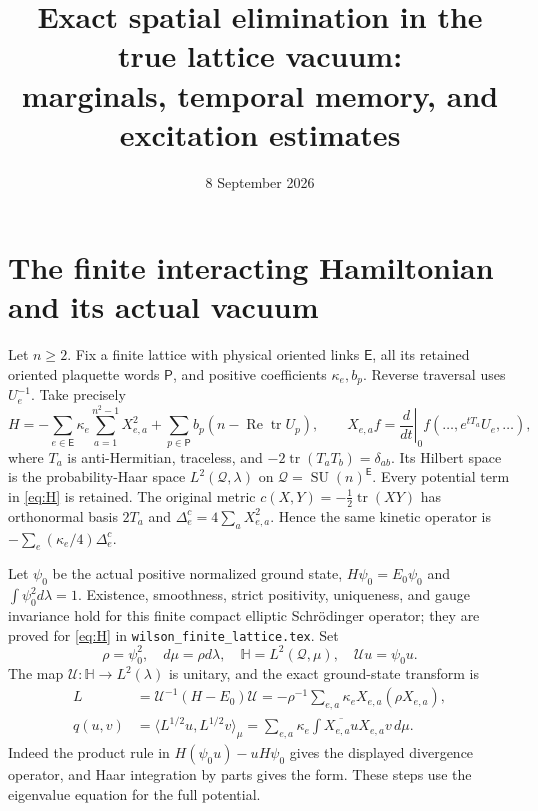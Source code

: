 \documentclass[11pt]{article}
\title{Exact spatial elimination in the true lattice vacuum:\\marginals, temporal memory, and excitation estimates}
\author{}
\date{8 September 2026}
\newcommand{\SU}{\operatorname{SU}}
\newcommand{\tr}{\operatorname{tr}}
\newcommand{\Rea}{\operatorname{Re}}
\begin{document}
\maketitle

\section{The finite interacting Hamiltonian and its actual vacuum}

Let $n\geq2$. Fix a finite lattice with physical oriented links
$\mathsf E$, all its retained oriented plaquette words $\mathsf P$, and
positive coefficients $\kappa_e,b_p$. Reverse traversal uses $U_e^{-1}$.
Take precisely
\begin{equation}\label{eq:H}
 H=-\sum_{e\in\mathsf E}\kappa_e\sum_{a=1}^{n^2-1}X_{e,a}^2
       +\sum_{p\in\mathsf P}b_p(n-\Rea\tr U_p),\qquad
 X_{e,a}f=\left.\frac d{dt}\right|_0f(\ldots,e^{tT_a}U_e,\ldots),
\end{equation}
where $T_a$ is anti-Hermitian, traceless, and
$-2\tr(T_aT_b)=\delta_{ab}$. Its Hilbert space is the probability-Haar
space $L^2(\mathcal Q,\lambda)$ on $\mathcal Q=\SU(n)^{\mathsf E}$.
Every potential term in \eqref{eq:H} is retained. The original metric
$c(X,Y)=-\tfrac12\tr(XY)$ has orthonormal basis $2T_a$ and
$\Delta_e^c=4\sum_aX_{e,a}^2$. Hence the same kinetic operator is
$-\sum_e(\kappa_e/4)\Delta_e^c$.

Let $\psi_0$ be the actual positive normalized ground state,
$H\psi_0=E_0\psi_0$ and $\int\psi_0^2d\lambda=1$. Existence,
smoothness, strict positivity, uniqueness, and gauge invariance hold
for this finite compact elliptic Schr\"odinger operator; they are proved
for \eqref{eq:H} in \texttt{wilson\_finite\_lattice.tex}. Set
\[
 \rho=\psi_0^2,\quad d\mu=\rho d\lambda,\quad
 \mathbb H=L^2(\mathcal Q,\mu),\quad \mathcal Uu=\psi_0u.
\]
The map $\mathcal U:\mathbb H\to L^2(\lambda)$ is unitary, and the
exact ground-state transform is
\begin{align}
 L&=\mathcal U^{-1}(H-E_0)\mathcal U
   =-\rho^{-1}\sum_{e,a}\kappa_eX_{e,a}(\rho X_{e,a}),\label{eq:L}\\
 q(u,v)&=\langle L^{1/2}u,L^{1/2}v\rangle_\mu
   =\sum_{e,a}\kappa_e\int\overline{X_{e,a}u}X_{e,a}v\,d\mu.
   \label{eq:fullform}
\end{align}
Indeed the product rule in $H(\psi_0u)-uH\psi_0$ gives the displayed
divergence operator, and Haar integration by parts gives the form.
These steps use the eigenvalue equation for the full potential.
\end{document}
